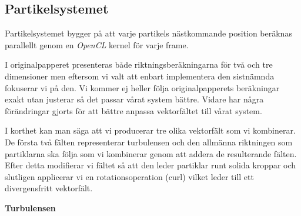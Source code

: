 \documentclass[a4paper]{article}
\begin{document}
\begin{multicols}{2}
    \vspace{-0.35cm}
    \subsection{Partikelsystemet} \label{sec:partikelsystemet}

    Partikelsystemet bygger på att varje partikels nästkommande position beräknas parallellt genom en \textit{OpenCL} kernel för varje frame. 

    I originalpapperet presenteras både riktningsberäkningarna för två och tre dimensioner men eftersom vi valt att enbart implementera den sistnämnda fokuserar vi på den. Vi kommer ej heller följa originalpapperets beräkningar exakt utan justerar så det passar vårat system bättre. Vidare har några förändringar gjorts för att bättre anpassa vektorfältet till vårat system.

    I korthet kan man säga att vi producerar tre olika vektorfält som vi kombinerar. De första två fälten representerar turbulensen och den allmänna riktningen som partiklarna ska följa som vi kombinerar genom att addera de resulterande fälten. Efter detta modifierar vi fältet så att den leder partiklar runt solida kroppar och slutligen applicerar vi en rotationsoperation (curl) vilket leder till ett divergensfritt vektorfält.

    \textbf{Turbulensen}


\end{multicols}
\end{document}
